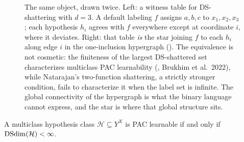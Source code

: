 \begin{figure}[ht]
\caption[DS-shattering and its star in the one-inclusion hypergraph]{%
The same object, drawn twice.  Left: a witness table for DS-shattering with
$d = 3$.  A default labeling $f$ assigns $a, b, c$ to $x_1, x_2, x_3$; each
hypothesis $h_i$ agrees with $f$ everywhere except at coordinate $i$, where it
deviates.  Right: that table \emph{is} the star joining $f$ to each $h_i$
along edge $i$ in the one-inclusion hypergraph ().  The
equivalence is not cosmetic: the finiteness of the largest DS-shattered set
characterizes multiclass PAC learnability (, Brukhim
et al.\ 2022), while Natarajan's two-function shattering, a strictly stronger
condition, fails to characterize it when the label set is infinite.  The
global connectivity of the hypergraph is what the binary language cannot
express, and the star is where that global structure sits.}
\label{fig:ds-shattering}
\end{figure}


\begin{thm}
\label{thm:multiclass-char}
A multiclass hypothesis class $\mathcal{H} \subseteq Y^X$ is PAC learnable if
and only if $\mathrm{DSdim}(\mathcal{H}) < \infty$.
\end{thm}


